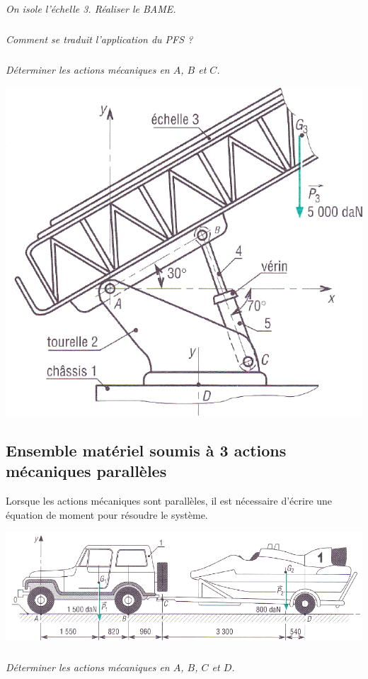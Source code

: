 \documentclass[10pt]{article}
\begin{document}
\subparagraph{}
\textit{On isole l'échelle 3. Réaliser le BAME.}

\subparagraph{}
\textit{Comment se traduit l'application du PFS ?}

\subparagraph{}
\textit{Déterminer les actions mécaniques  en $A$, $B$ et $C$.}

\begin{center}
\includegraphics[width=.7\textwidth]{images/echelle}
\end{center}

\newpage

\subsection*{Ensemble matériel soumis à 3 actions mécaniques parallèles}
\begin{resultat}
Lorsque les actions mécaniques sont parallèles, il est nécessaire d'écrire une équation de moment pour résoudre le système. 
\end{resultat}

\begin{center}
\includegraphics[width=.95\textwidth]{images/remorque}
\end{center}


\subparagraph{}
\textit{Déterminer les actions mécaniques  en $A$, $B$, $C$ et $D$.}
\end{document}
